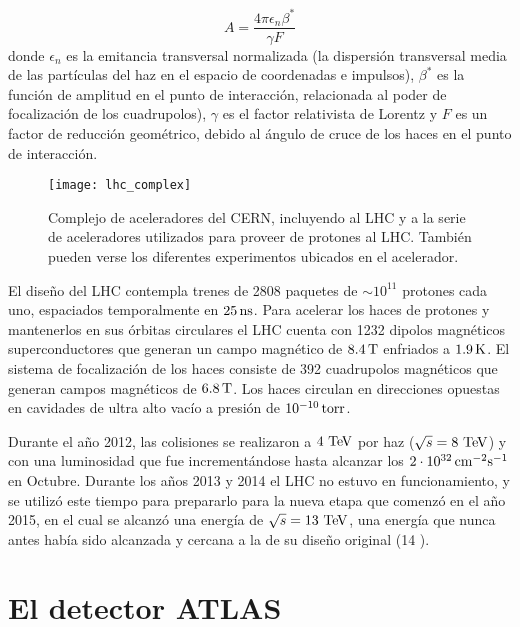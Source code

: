 \begin{equation}
  A = \frac{4\pi \epsilon_n \beta^{*}}{\gamma F}
\end{equation}
%
donde $\epsilon_n$ es la emitancia transversal normalizada (la dispersión
transversal media de las partículas del haz en el espacio de coordenadas e
impulsos), $\beta^{*}$ es la función de amplitud en el punto de interacción,
relacionada al poder de focalización de los cuadrupolos), $\gamma$ es el
factor relativista de Lorentz y $F$ es un factor de reducción geométrico, debido
al ángulo de cruce de los haces en el punto de interacción.

\begin{figure}[!p]
  \centering

  \texttt{[image: lhc\_complex]}

  \caption{Complejo de aceleradores del CERN, incluyendo al LHC y a la serie
    de aceleradores utilizados para proveer de protones al LHC. También pueden verse
    los diferentes experimentos ubicados en el acelerador.}
  \label{fig:lhc_complex}

\end{figure}

El diseño del LHC contempla trenes de 2808 paquetes de $\sim 10^{11}$ protones cada uno,
espaciados temporalmente en $\unit[25]{ns}$.
Para acelerar los haces de protones y mantenerlos en sus órbitas circulares el
LHC cuenta con 1232 dipolos magnéticos superconductores que generan un campo
magnético de $\unit[8.4]{T}$ enfriados a $\unit[1.9]{K}$. El sistema de focalización de los haces
consiste de 392 cuadrupolos magnéticos que generan campos magnéticos de $\unit[6.8]{T}$.
Los haces circulan en direcciones opuestas en cavidades de ultra alto vacío
a presión de $\unit[10^{-10}]{torr}$.

Durante el año 2012, las colisiones se realizaron a $4\TeV$ por haz ($\sqrt{s} = 8 \TeV$)
y con una luminosidad que fue incrementándose hasta alcanzar los
$\unit[2 \cdot 10^{32}]{cm^{-2}s^{-1}}$ en Octubre. Durante los a\~nos 2013 y 2014
el LHC no estuvo en funcionamiento, y se utilizó este tiempo para prepararlo para
la nueva etapa que comenzó en el a\~no 2015, en el cual se alcanzó una energía de $\sqrt{s} = 13 \tev$,
una energía que nunca antes había sido alcanzada y cercana a la de su diseño
original (14 \tev).



\section{El detector ATLAS}

